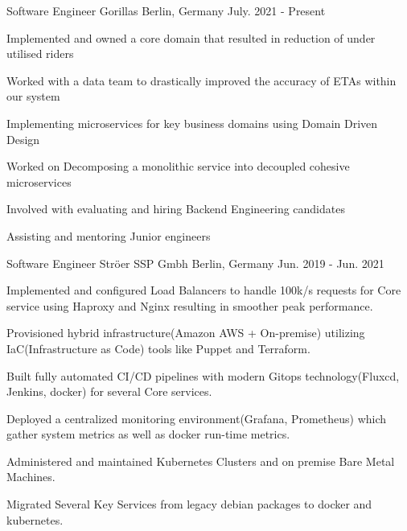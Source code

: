 

\begin{cventries}

\cventry
{Software Engineer} %
{Gorillas} %
{Berlin, Germany} %
{July. 2021 - Present} %
{
  \begin{cvitems} %
    \item {Implemented and owned a core domain that resulted in reduction of under utilised riders}
    \item {Worked with a data team to drastically improved the accuracy of ETAs within our system}
    \item {Implementing microservices for key business domains using Domain Driven Design}
    \item {Worked on Decomposing a monolithic service into decoupled cohesive microservices}
    \item {Involved with evaluating and hiring Backend Engineering candidates}
    \item {Assisting and mentoring Junior engineers}
  \end{cvitems}
}

  \cventry
    {Software Engineer} %
    {Ströer SSP Gmbh} %
    {Berlin, Germany} %
    {Jun. 2019 - Jun. 2021} %
    {
      \begin{cvitems} %
        \item {Implemented and configured Load Balancers to handle 100k/s requests for Core service using Haproxy and Nginx resulting in smoother peak performance.}
        \item {Provisioned hybrid infrastructure(Amazon AWS + On-premise) utilizing IaC(Infrastructure as Code) tools like Puppet and Terraform.}
        \item {Built fully automated CI/CD pipelines with modern Gitops technology(Fluxcd, Jenkins, docker) for several Core services.}
        \item {Deployed a centralized monitoring environment(Grafana, Prometheus) which gather system metrics as well as docker run-time metrics.}
        \item {Administered and maintained Kubernetes Clusters and on premise Bare Metal Machines.}
        \item {Migrated Several Key Services from legacy debian packages to docker and kubernetes.}
      \end{cvitems}
    }


\end{cventries}
